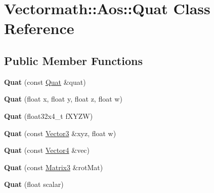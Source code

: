 \hypertarget{classVectormath_1_1Aos_1_1Quat}{}\section{Vectormath\+:\+:Aos\+:\+:Quat Class Reference}
\label{classVectormath_1_1Aos_1_1Quat}
\subsection*{Public Member Functions}
\begin{DoxyCompactItemize}
\item 
\mbox{\label{classVectormath_1_1Aos_1_1Quat_a102854a15448f2159ad8ed45e2573275}} 
{\bfseries Quat} (const \hyperlink{classVectormath_1_1Aos_1_1Quat}{Quat} \&quat)
\item 
\mbox{\label{classVectormath_1_1Aos_1_1Quat_affbeca410d11cee6e77ea27c610ab386}} 
{\bfseries Quat} (float x, float y, float z, float w)
\item 
\mbox{\label{classVectormath_1_1Aos_1_1Quat_aa547779cc63b69ef0c1444032929273d}} 
{\bfseries Quat} (float32x4\+\_\+t f\+X\+Y\+ZW)
\item 
\mbox{\label{classVectormath_1_1Aos_1_1Quat_a8af91b1419e8548fc2d987fc662dce64}} 
{\bfseries Quat} (const \hyperlink{classVectormath_1_1Aos_1_1Vector3}{Vector3} \&xyz, float w)
\item 
\mbox{\label{classVectormath_1_1Aos_1_1Quat_a60356545117438d21499d0afd7d689da}} 
{\bfseries Quat} (const \hyperlink{classVectormath_1_1Aos_1_1Vector4}{Vector4} \&vec)
\item 
\mbox{\label{classVectormath_1_1Aos_1_1Quat_a6ee788faa20607fe4c9823ef2065c689}} 
{\bfseries Quat} (const \hyperlink{classVectormath_1_1Aos_1_1Matrix3}{Matrix3} \&rot\+Mat)
\item 
\mbox{\label{classVectormath_1_1Aos_1_1Quat_ab3080be7cc946bf0fe1388155d3df50a}} 
{\bfseries Quat} (float scalar)
\item 

\end{DoxyCompactItemize}
